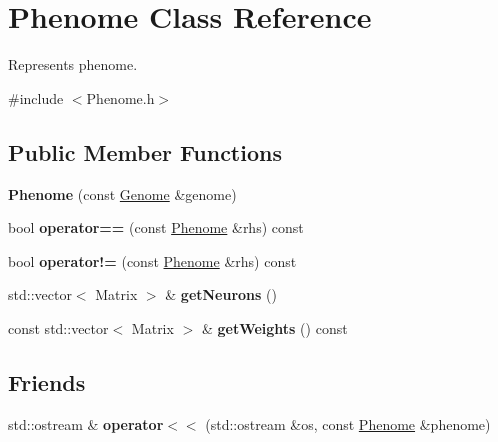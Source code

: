 \hypertarget{classPhenome}{}\section{Phenome Class Reference}
\label{classPhenome}


Represents phenome.  




{\ttfamily \#include $<$Phenome.\+h$>$}

\subsection*{Public Member Functions}
\begin{DoxyCompactItemize}
\item 
{\bfseries Phenome} (const \hyperlink{classGenome}{Genome} \&genome)\hypertarget{classPhenome_a900e3f448b143b5db3d44d8ff57f07e3}{}\label{classPhenome_a900e3f448b143b5db3d44d8ff57f07e3}

\item 
bool {\bfseries operator==} (const \hyperlink{classPhenome}{Phenome} \&rhs) const \hypertarget{classPhenome_a4aa383a3c22ab02cf4a58d68b83a70b7}{}\label{classPhenome_a4aa383a3c22ab02cf4a58d68b83a70b7}

\item 
bool {\bfseries operator!=} (const \hyperlink{classPhenome}{Phenome} \&rhs) const \hypertarget{classPhenome_a79ecab1c0a34f2f225d367782b72516c}{}\label{classPhenome_a79ecab1c0a34f2f225d367782b72516c}

\item 
std\+::vector$<$ Matrix $>$ \& {\bfseries get\+Neurons} ()\hypertarget{classPhenome_a8188a170ca1f162932a9a90bb8790599}{}\label{classPhenome_a8188a170ca1f162932a9a90bb8790599}

\item 
const std\+::vector$<$ Matrix $>$ \& {\bfseries get\+Weights} () const \hypertarget{classPhenome_af995a7151ac1e461559937889f0c02c9}{}\label{classPhenome_af995a7151ac1e461559937889f0c02c9}

\end{DoxyCompactItemize}
\subsection*{Friends}
\begin{DoxyCompactItemize}
\item 
std\+::ostream \& {\bfseries operator$<$$<$} (std\+::ostream \&os, const \hyperlink{classPhenome}{Phenome} \&phenome)\hypertarget{classPhenome_a34c29d70c5bc8815abcedce0aaf0cfd4}{}\label{classPhenome_a34c29d70c5bc8815abcedce0aaf0cfd4}

\end{DoxyCompactItemize}


